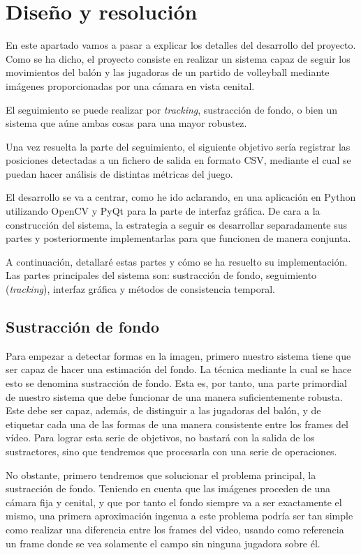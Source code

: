 \section{Diseño y resolución}

En este apartado vamos a pasar a explicar los detalles del desarrollo del proyecto. Como se ha dicho, el proyecto consiste en realizar un sistema capaz de seguir los movimientos del balón y las jugadoras de un partido de volleyball mediante imágenes proporcionadas por una cámara en vista cenital.

El seguimiento se puede realizar por \textit{tracking}, sustracción de fondo, o bien un sistema que aúne ambas cosas para una mayor robustez.

Una vez resuelta la parte del seguimiento, el siguiente objetivo sería registrar las posiciones detectadas a un fichero de salida en formato CSV, mediante el cual se puedan hacer análisis de distintas métricas del juego.

El desarrollo se va a centrar, como he ido aclarando, en una aplicación en Python utilizando OpenCV y PyQt para la parte de interfaz gráfica. De cara a la construcción del sistema, la estrategia a seguir es desarrollar separadamente sus partes y posteriormente implementarlas para que funcionen de manera conjunta.

A continuación, detallaré estas partes y cómo se ha resuelto su implementación. Las partes principales del sistema son: sustracción de fondo, seguimiento (\textit{tracking}), interfaz gráfica y métodos de consistencia temporal.

\subsection{Sustracción de fondo}
\label{sec:subtractors}
Para empezar a detectar formas en la imagen, primero nuestro sistema tiene que ser capaz de hacer una estimación del fondo. La técnica mediante la cual se hace esto se denomina sustracción de fondo. Esta es, por tanto, una parte primordial de nuestro sistema que debe funcionar de una manera suficientemente robusta. Este debe ser capaz, además, de distinguir a las jugadoras del balón, y de etiquetar cada una de las formas de una manera consistente entre los frames del vídeo. Para lograr esta serie de objetivos, no bastará con la salida de los sustractores, sino que tendremos que procesarla con una serie de operaciones.

No obstante, primero tendremos que solucionar el problema principal, la sustracción de fondo. Teniendo en cuenta que las imágenes proceden de una cámara fija y cenital, y que por tanto el fondo siempre va a ser exactamente el mismo, una primera aproximación ingenua a este problema podría ser tan simple como realizar una diferencia entre los frames del video, usando como referencia un frame donde se vea solamente el campo sin ninguna jugadora sobre él.


